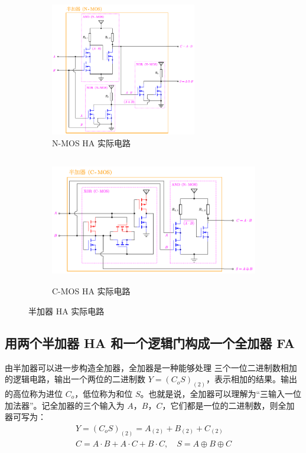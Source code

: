 \documentclass[UTF8]{report}
\theoremstyle{MyLineTheoremStyle} %
\theoremstyle{MyBlockTheoremStyle} %
\theoremstyle{MySubsubsectionStyle} %
\begin{document}
\begin{figure}[H]\centering
\begin{subfigure}[t]{0.42\columnwidth}\centering
    \includegraphics[height=165pt]{assets/5/NMOS 半加器实际电路.pdf}
    \caption{ N-MOS HA 实际电路 }
\end{subfigure}\hfill
\begin{subfigure}[t]{0.58\columnwidth}\centering
    \includegraphics[height=160pt]{assets/5/CMOS 半加器实际电路.pdf}
    \caption{ C-MOS HA 实际电路 }
\end{subfigure}
\caption{ 半加器 HA 实际电路 }\label{半加器 HA 实际电路}
\end{figure}

\subsection{用两个半加器 HA 和一个逻辑门构成一个全加器 FA}

由半加器可以进一步构造全加器，全加器是一种能够处理{\color{red} 三个一位二进制数}相加的逻辑电路，输出一个两位的二进制数 $Y= (C_o S)_{(2)}$，表示相加的结果。输出的高位称为进位 $C_o$，低位称为和位 $S$。也就是说，全加器可以理解为“三输入一位加法器”。记全加器的三个输入为 $A$，$B$，$C$，它们都是一位的二进制数，则全加器可写为：
\begin{gather}
Y= (C_oS)_{(2)} = A_{(2)} + B_{(2)} + C_{(2)} 
\\ 
C = A \cdot B + A \cdot C + B \cdot C,\quad 
S = A \oplus B \oplus C
\end{gather}
\end{document}
